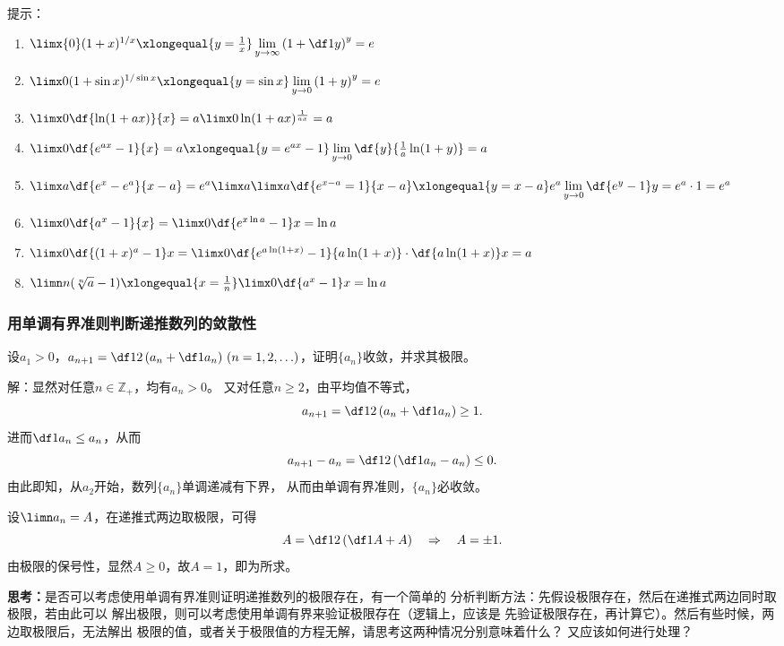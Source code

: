 \ifhint
提示：
\begin{enumerate}[(1)]
	\setlength{\itemindent}{1cm}
	\item $\limx{0}(1+x)^{1/x}
	\xlongequal{y=\frac1x}
	\lim\limits_{y\to\infty}\left(1+\df1y\right)^y=e$ 
	\item $\limx 0(1+\sin x)^{1/\sin x}
	\xlongequal{y=\sin x}\lim\limits_{y\to0}\left(1+y\right)^y=e$ 
	\item $\limx 0\df{\ln(1+ax)}{x}
	=a\limx0\ln(1+ax)^{\frac1{ax}}=a$
	\item $\limx 0\df{e^{ax}-1}{x}=a
	\xlongequal{y=e^{ax}-1}
	\lim\limits_{y\to0}\df{y}{\frac1a\ln(1+y)}=a$ 
	\item $\limx a\df{e^x-e^a}{x-a}=e^{a}\limx a
	\limx a\df{e^{x-a}=1}{x-a}\xlongequal{y=x-a}
	e^a\lim\limits_{y\to 0}\df{e^y-1}y=e^a\cdot 1=e^a$
	\item $\limx0\df{a^x-1}{x}
	=\limx0\df{e^{x\ln a}-1}x=\ln a$ 
	\item $\limx0\df{(1+x)^a-1}x
	=\limx0\df{e^{a\ln(1+x)}-1}{a\ln(1+x)}
	\cdot\df{a\ln(1+x)}x=a$
	\item $\limn n(\sqrt[n]{a}-1)
	\xlongequal{x=\frac1n}
	\limx0\df{a^x-1}x=\ln a$ 
\end{enumerate}
\fi

\subsubsection{用单调有界准则判断递推数列的敛散性}

\bs
\egz 
设$a_1>0$，$a_{n+1}=\df 12\left(a_n+\df 1{a_n}\right)\,
(n=1,2,\ldots)$，证明$\{a_n\}$收敛，并求其极限。

解：显然对任意$n\in\mathbb{Z}_+$，均有$a_n>0$。
又对任意$n\geq2$，由平均值不等式，
$$a_{n+1}=\df 12\left(a_n+\df 1{a_n}\right)\geq 1.$$
进而$\df1{a_n}\leq a_n$，从而
$$a_{n+1}-a_n=\df12\left(\df1{a_n}-a_n\right)\leq0.$$
由此即知，从$a_2$开始，数列$\{a_n\}$单调递减有下界，
从而由单调有界准则，$\{a_n\}$必收敛。

设$\limn a_n=A$，在递推式两边取极限，可得
$$A=\df12\left(\df1A+A\right)\quad\Rightarrow\quad A=\pm1.$$
由极限的保号性，显然$A\geq0$，故$A=1$，即为所求。\fin

{\bf 思考：}是否可以考虑使用单调有界准则证明递推数列的极限存在，有一个简单的
分析判断方法：先假设极限存在，然后在递推式两边同时取极限，若由此可以
解出极限，则可以考虑使用单调有界来验证极限存在（逻辑上，应该是
先验证极限存在，再计算它）。然后有些时候，两边取极限后，无法解出
极限的值，或者关于极限值的方程无解，请思考这两种情况分别意味着什么？
又应该如何进行处理？


